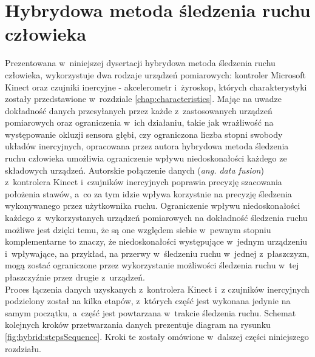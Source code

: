 \chapter{Hybrydowa metoda śledzenia ruchu człowieka}\label{chap:hybrid}

Prezentowana w~niniejszej dysertacji hybrydowa metoda śledzenia ruchu człowieka, wykorzystuje dwa rodzaje urządzeń pomiarowych: kontroler Microsoft Kinect oraz czujniki inercyjne - akcelerometr i~żyroskop, których charakterystyki zostały przedstawione w~rozdziale \ref{chap:characteristics}. Mając na uwadze dokładność danych przesyłanych przez każde z~zastosowanych urządzeń pomiarowych oraz ograniczenia w~ich działaniu, takie jak wrażliwość na występowanie okluzji sensora głębi, czy ograniczona liczba stopni swobody układów inercyjnych, opracowana przez autora hybrydowa metoda śledzenia ruchu człowieka umożliwia ograniczenie wpływu niedoskonałości każdego ze składowych urządzeń. Autorskie połączenie danych (\emph{ang. data fusion}) z~kontrolera Kinect i~czujników inercyjnych poprawia precyzję szacowania położenia stawów, a~co za tym idzie wpływa korzystnie na precyzję śledzenia wykonywanego przez użytkownika ruchu. Ograniczenie wpływu niedoskonałości każdego z~wykorzystanych urządzeń pomiarowych na dokładność śledzenia ruchu możliwe jest dzięki temu, że są one względem siebie w~pewnym stopniu komplementarne to znaczy, że niedoskonałości występujące w~jednym urządzeniu i~wpływające, na przykład, na przerwy w~śledzeniu ruchu w~jednej z~płaszczyzn, mogą zostać ograniczone przez wykorzystanie możliwości śledzenia ruchu w~tej płaszczyźnie przez drugie z~urządzeń.\\
Proces łączenia danych uzyskanych z~kontrolera Kinect i~z czujników inercyjnych podzielony został na kilka etapów, z~których część jest wykonana jedynie na samym początku, a~część jest powtarzana w~trakcie śledzenia ruchu. Schemat kolejnych kroków przetwarzania danych prezentuje diagram na rysunku \ref{fig:hybrid:stepsSequence}. Kroki te zostały omówione w~dalszej części niniejszego rozdziału.\\

